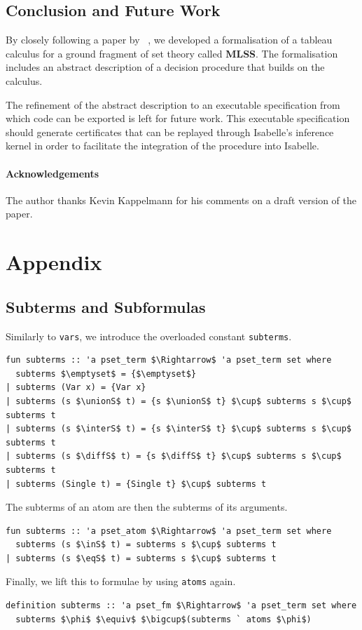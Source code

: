 \documentclass[runningheads]{llncs}
\newcommand{\MLSS}{\textbf{MLSS}}
\newcommand{\unionS}{\sqcup_\text{s}}
\newcommand{\interS}{\sqcap_\text{s}}
\newcommand{\diffS}{-_\text{s}}
\newcommand{\inS}{\in_\text{s}}
\newcommand{\eqS}{=_\text{s}}
\begin{document}
\section{Conclusion and Future Work}
By closely following a paper by \citeauthor{new_fast_tableau}~\cite{new_fast_tableau}, we developed a formalisation of a tableau calculus for a ground fragment of set theory called \MLSS{}.
The formalisation includes an abstract description of a decision procedure that builds on the calculus.

The refinement of the abstract description to an executable specification from which code can be exported is left for future work.
This executable specification should generate certificates that can be replayed through Isabelle's inference kernel in order to facilitate the integration of the procedure into Isabelle.


\subsubsection{Acknowledgements}
The author thanks Kevin Kappelmann for his comments on a draft version of the paper.



\appendix
\clearpage\chapter*{Appendix}

\section{Subterms and Subformulas}

Similarly to \lstinline!vars!, we introduce the overloaded constant \lstinline!subterms!.
\begin{lstlisting}
fun subterms :: 'a pset_term $\Rightarrow$ 'a pset_term set where
  subterms $\emptyset$ = {$\emptyset$}
| subterms (Var x) = {Var x}
| subterms (s $\unionS$ t) = {s $\unionS$ t} $\cup$ subterms s $\cup$ subterms t
| subterms (s $\interS$ t) = {s $\interS$ t} $\cup$ subterms s $\cup$ subterms t
| subterms (s $\diffS$ t) = {s $\diffS$ t} $\cup$ subterms s $\cup$ subterms t
| subterms (Single t) = {Single t} $\cup$ subterms t
\end{lstlisting}
The subterms of an atom are then the subterms of its arguments.
\begin{lstlisting}
fun subterms :: 'a pset_atom $\Rightarrow$ 'a pset_term set where
  subterms (s $\inS$ t) = subterms s $\cup$ subterms t
| subterms (s $\eqS$ t) = subterms s $\cup$ subterms t
\end{lstlisting}
Finally, we lift this to formulae by using \lstinline!atoms! again.
\begin{lstlisting}
definition subterms :: 'a pset_fm $\Rightarrow$ 'a pset_term set where
  subterms $\phi$ $\equiv$ $\bigcup$(subterms ` atoms $\phi$)
\end{lstlisting}
\end{document}
